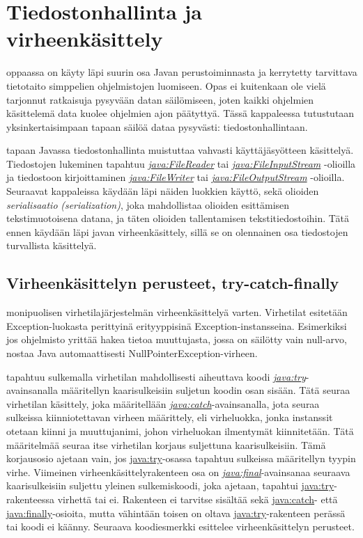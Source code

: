 \documentclass{tufte-book}
\newcommand{\eng}[1]{\textit{(#1)}}
\newcommand{\new}[1]{\textit{\gls{#1}}}
\newcommand{\neweng}[2]{\new{#1} \eng{#2}}
\newcommand{\java}[1]{\underline{\gls{java:#1}}}
\newcommand{\newjava}[1]{\textit{\java{#1}}}
\begin{document}
\chapter{Tiedostonhallinta ja virheenkäsittely}
\label{tiedostoista}

 oppaassa on käyty läpi suurin osa Javan perustoiminnasta ja kerrytetty
tarvittava tietotaito simppelien ohjelmistojen luomiseen. Opas ei kuitenkaan ole vielä tarjonnut
ratkaisuja pysyvään datan säilömiseen, joten kaikki ohjelmien käsittelemä data kuolee ohjelmien
ajon päätyttyä. Tässä kappaleessa tutustutaan yksinkertaisimpaan tapaan säilöä dataa pysyvästi:
tiedostonhallintaan. 

 tapaan Javassa tiedostonhallinta muistuttaa vahvasti
käyttäjäsyötteen käsittelyä. Tiedostojen lukeminen tapahtuu \newjava{FileReader} tai
\newjava{FileInputStream} -olioilla ja tiedostoon kirjoittaminen \newjava{FileWriter} tai
\newjava{FileOutputStream} -olioilla. Seuraavat kappaleissa käydään läpi näiden luokkien käyttö,
sekä olioiden \neweng{serialisaatio}{serialization}, joka mahdollistaa olioiden esittämisen
tekstimuotoisena datana, ja täten olioiden tallentamisen tekstitiedostoihin. Tätä ennen käydään
läpi javan virheenkäsittely, sillä se on olennainen osa tiedostojen turvallista käsittelyä.


\section{Virheenkäsittelyn perusteet, try-catch-finally}
\label{try-catch}

 monipuolisen virhetilajärjestelmän virheenkäsittelyä varten. Virhetilat
esitetään Exception-luokasta perittyinä erityyppisinä Exception-instansseina. Esimerkiksi jos
ohjelmisto yrittää hakea tietoa muuttujasta, jossa on säilötty vain null-arvo, nostaa Java
automaattisesti NullPointerException-virheen. 

 tapahtuu sulkemalla virhetilan mahdollisesti aiheuttava koodi
\newjava{try}-avainsanalla määritellyn kaarisulkeisiin suljetun koodin osan sisään. Tätä seuraa
virhetilan käsittely, joka määritellään \newjava{catch}-avainsanalla, jota seuraa sulkeissa
kiinniotettavan virheen määrittely, eli virheluokka, jonka instanssit otetaan kiinni ja
muuttujanimi, johon virheluokan ilmentymät kiinnitetään. Tätä määritelmää seuraa itse virhetilan
korjaus suljettuna kaarisulkeisiin. Tämä korjausosio ajetaan vain, jos \java{try}-osassa tapahtuu
sulkeissa määritellyn tyypin virhe. Viimeinen virheenkäsittelyrakenteen osa on
\newjava{final}-avainsanaa seuraava kaarisulkeisiin suljettu yleinen sulkemiskoodi, joka ajetaan,
tapahtui \java{try}-rakenteessa virhettä tai ei. Rakenteen ei tarvitse sisältää sekä \java{catch}-
että \java{finally}-osioita, mutta vähintään toisen on oltava \java{try}-rakenteen perässä tai
koodi ei käänny. Seuraava koodiesmerkki esittelee virheenkäsittelyn perusteet.
\end{document}
